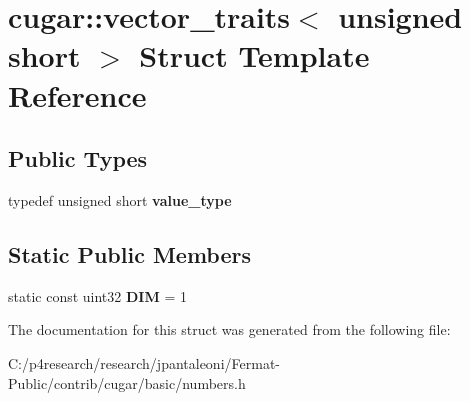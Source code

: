 \hypertarget{structcugar_1_1vector__traits_3_01unsigned_01short_01_4}{}\section{cugar\+:\+:vector\+\_\+traits$<$ unsigned short $>$ Struct Template Reference}
\label{structcugar_1_1vector__traits_3_01unsigned_01short_01_4}
\subsection*{Public Types}
\begin{DoxyCompactItemize}
\item 
\mbox{\label{structcugar_1_1vector__traits_3_01unsigned_01short_01_4_a2d8016d86482fbe02e6ee23e8f6f44c7}} 
typedef unsigned short {\bfseries value\+\_\+type}
\end{DoxyCompactItemize}
\subsection*{Static Public Members}
\begin{DoxyCompactItemize}
\item 
\mbox{\label{structcugar_1_1vector__traits_3_01unsigned_01short_01_4_a91a64aca25845ba993b4ad7db0ca9ac8}} 
static const uint32 {\bfseries D\+IM} = 1
\end{DoxyCompactItemize}


The documentation for this struct was generated from the following file\+:\begin{DoxyCompactItemize}
\item 
C\+:/p4research/research/jpantaleoni/\+Fermat-\/\+Public/contrib/cugar/basic/numbers.\+h\end{DoxyCompactItemize}
